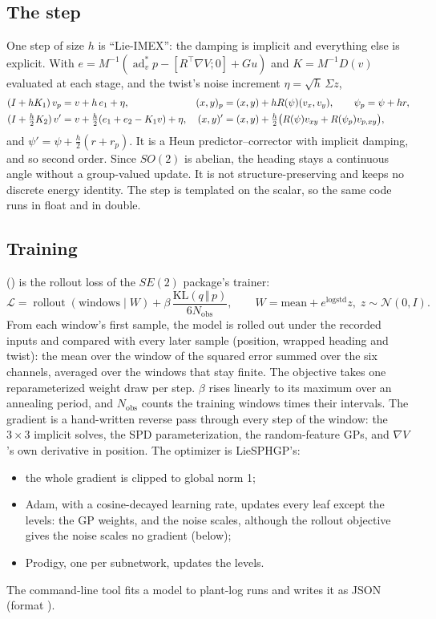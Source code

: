 \documentclass[11pt]{article}
\theoremstyle{remark}
\newcommand{\T}{^{\top}}
\begin{document}
\subsection{The step}
One step of size $h$ is ``Lie-IMEX'': the damping is implicit and everything else is explicit. With
$e=M^{-1}(\operatorname{ad}^*_vp-[R\T\nabla V;0]+Gu)$ and $K=M^{-1}D(v)$ evaluated at each stage,
and the twist's noise increment $\eta=\sqrt h\,\Sigma z$,
\begin{align}
  (I+hK_1)\,v_p&=v+h\,e_1+\eta, &(x,y)_p&=(x,y)+hR(\psi)(v_x,v_y), \qquad \psi_p=\psi+hr,\notag\\
  (I+\tfrac h2K_2)\,v'&=v+\tfrac h2(e_1+e_2-K_1v)+\eta, &(x,y)'&=(x,y)+\tfrac h2\big(R(\psi)v_{xy}+R(\psi_p)v_{p,xy}\big),
  \label{eq:imex}
\end{align}
and $\psi'=\psi+\tfrac h2(r+r_p)$. It is a Heun predictor--corrector with implicit damping, and so
second order. Since $SO(2)$ is abelian, the heading stays a continuous angle without a
group-valued update. It is not structure-preserving and keeps no discrete energy identity. The
step is templated on the scalar, so the same code runs in float and in double.

\subsection{Training}
 () is the rollout loss of the
$SE(2)$ package's trainer:
\begin{equation}
  \mathcal L=\operatorname{rollout}(\text{windows}\mid W)+\beta\,\frac{\mathrm{KL}(q\,\Vert\,p)}{6N_{\mathrm{obs}}},
  \qquad W=\text{mean}+e^{\log\text{std}}z,\;z\sim\mathcal N(0,I).
  \label{eq:objective}
\end{equation}
From each window's first sample, the model is rolled out under the recorded inputs and compared
with every later sample (position, wrapped heading and twist): the mean over the window of the
squared error summed over the six channels, averaged over the windows that stay finite. The
objective takes one reparameterized weight draw per step. $\beta$ rises linearly to its maximum
over an annealing period, and $N_{\mathrm{obs}}$ counts the training windows times their
intervals. The gradient is a hand-written reverse pass through every step of the window: the
$3\times3$ implicit solves, the SPD parameterization, the random-feature GPs, and $\nabla V$'s own
derivative in position. The optimizer is LieSPHGP's:
\begin{itemize}
  \item the whole gradient is clipped to global norm 1;
  \item Adam, with a cosine-decayed learning rate, updates every leaf except the levels: the GP
        weights, and the noise scales, although the rollout objective gives the noise scales no
        gradient (below);
  \item Prodigy, one per subnetwork, updates the levels.
\end{itemize}
The command-line tool  fits a model to plant-log runs and writes it as JSON
(format ).
\end{document}
